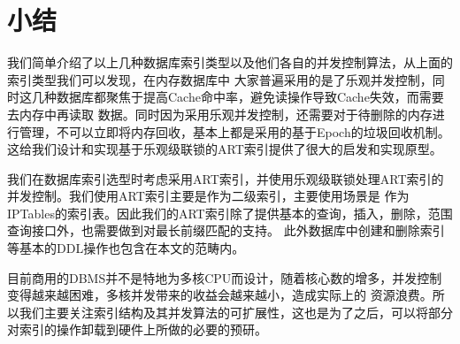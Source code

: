 \section{小结}

我们简单介绍了以上几种数据库索引类型以及他们各自的并发控制算法，从上面的索引类型我们可以发现，在内存数据库中
大家普遍采用的是了乐观并发控制，同时这几种数据库都聚焦于提高Cache命中率，避免读操作导致Cache失效，而需要去内存中再读取
数据。同时因为采用乐观并发控制，还需要对于待删除的内存进行管理，不可以立即将内存回收，基本上都是采用的基于Epoch的垃圾回收机制。
这给我们设计和实现基于乐观级联锁的ART索引提供了很大的启发和实现原型。

我们在数据库索引选型时考虑采用ART索引，并使用乐观级联锁处理ART索引的并发控制。我们使用ART索引主要是作为二级索引，主要使用场景是
作为IPTables的索引表。因此我们的ART索引除了提供基本的查询，插入，删除，范围查询接口外，也需要做到对最长前缀匹配的支持。
此外数据库中创建和删除索引等基本的DDL操作也包含在本文的范畴内。

目前商用的DBMS并不是特地为多核CPU而设计，随着核心数的增多，并发控制变得越来越困难，多核并发带来的收益会越来越小，造成实际上的
资源浪费。所以我们主要关注索引结构及其并发算法的可扩展性，这也是为了之后，可以将部分对索引的操作卸载到硬件上所做的必要的预研。

